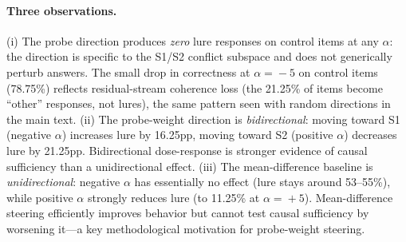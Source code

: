 \documentclass{article}
\begin{document}
\paragraph{Three observations.}
(i) The probe direction produces \emph{zero} lure responses on control
items at any $\alpha$: the direction is specific to the S1/S2 conflict
subspace and does not generically perturb answers.  The small drop in
correctness at $\alpha\!=\!-5$ on control items (78.75\%) reflects
residual-stream coherence loss (the 21.25\% of items become ``other''
responses, not lures), the same pattern seen with random directions
in the main text.  (ii) The probe-weight direction is \emph{bidirectional}:
moving toward S1 (negative $\alpha$) increases lure by 16.25pp,
moving toward S2 (positive $\alpha$) decreases lure by 21.25pp.
Bidirectional dose-response is stronger evidence of causal sufficiency
than a unidirectional effect.  (iii) The mean-difference baseline is
\emph{unidirectional}: negative $\alpha$ has essentially no effect
(lure stays around 53--55\%), while positive $\alpha$ strongly
reduces lure (to 11.25\% at $\alpha\!=\!+5$).  Mean-difference
steering efficiently improves behavior but cannot test causal
sufficiency by worsening it---a key methodological motivation for
probe-weight steering.
\end{document}
